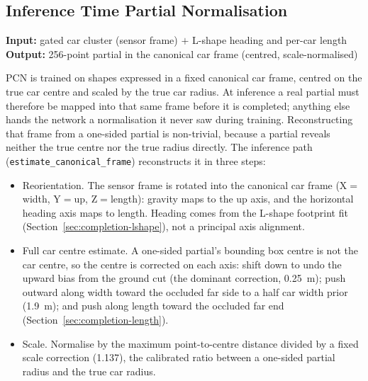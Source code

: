 \documentclass[a4paper,12pt]{report}
\begin{document}
\subsection{Inference Time Partial Normalisation}
\label{sec:completion-normalisation}

\noindent \textbf{Input:} gated car cluster (sensor frame) $+$ L-shape heading and per-car length \quad \textbar \quad \textbf{Output:} \num{256}-point partial in the canonical car frame (centred, scale-normalised) \vspace{0.5em}

PCN is trained on shapes expressed in a fixed canonical car frame, centred on the
true car centre and scaled by the true car radius. At inference a real partial
must therefore be mapped into that same frame before it is completed; anything else
hands the network a normalisation it never saw during training. Reconstructing that
frame from a one-sided partial is non-trivial, because a partial reveals neither the
true centre nor the true radius directly. The inference path
(\texttt{estimate\_canonical\_frame}) reconstructs it in three steps:

\begin{itemize}
  \item Reorientation. The sensor frame is rotated into the canonical
    car frame (X${}={}$width, Y${}={}$up, Z${}={}$length): gravity maps to the
    up axis, and the horizontal heading axis maps to length. Heading comes from the
    L-shape footprint fit (Section~\ref{sec:completion-lshape}), not a principal axis
    alignment.
  \item Full car centre estimate. A one-sided partial's bounding box
    centre is not the car centre, so the centre is corrected on each axis: shift
    down to undo the upward bias from the ground cut (the dominant
    correction, \SI{0.25}{\meter}); push outward along width toward the
    occluded far side to a half car width prior (\SI{1.9}{\meter}); and push
    along length toward the occluded far end (Section~\ref{sec:completion-length}).
  \item Scale. Normalise by the maximum point-to-centre distance divided
    by a fixed scale correction (\num{1.137}), the calibrated ratio between a
    one-sided partial radius and the true car radius.
\end{itemize}
\end{document}
